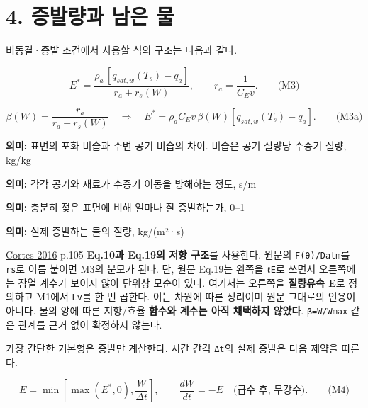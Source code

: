 \documentclass[11pt,a4paper]{article}
\begin{document}
\section{4. 증발량과 남은 물}

비동결·증발 조건에서 사용할 식의 구조는 다음과 같다.

\begin{equation*}
E^*=\frac{\rho_a\,[q_{sat,w}(T_s)-q_a]}{r_a+r_s(W)},\qquad
r_a=\frac{1}{C_Ev}.\qquad\text{(M3)}
\end{equation*}

\begin{equation*}
\beta(W)=\frac{r_a}{r_a+r_s(W)}\quad\Longrightarrow\quad
E^*=\rho_a C_Ev\,\beta(W)[q_{sat,w}(T_s)-q_a].\qquad\text{(M3a)}
\end{equation*}

\begin{description}[leftmargin=0pt,style=nextline]
\item[\texttt{qsat,w(Ts)−qa}] \textbf{의미:} 표면의 포화 비습과 주변 공기 비습의 차이. 비습은 공기 질량당 수증기 질량, kg/kg
\item[\texttt{ra}, \texttt{rs}] \textbf{의미:} 각각 공기와 재료가 수증기 이동을 방해하는 정도, s/m
\item[\texttt{β}] \textbf{의미:} 충분히 젖은 표면에 비해 얼마나 잘 증발하는가, 0–1
\item[\texttt{E}] \textbf{의미:} 실제 증발하는 물의 질량, kg/(m²·s)
\end{description}

\href{\detokenize{https://www.jstage.jst.go.jp/article/taiki/51/2/51_103/_pdf/-char/en}}{Cortes 2016} p.105 \textbf{Eq.10과 Eq.19의 저항 구조}를 사용한다. 원문의 \texttt{F(θ)/Datm}를 \texttt{rs}로 이름 붙이면 M3의 분모가 된다. 단, 원문 Eq.19는 왼쪽을 \texttt{ℓE}로 쓰면서 오른쪽에는 잠열 계수가 보이지 않아 단위상 모순이 있다. 여기서는 오른쪽을 \textbf{질량유속 E}로 정의하고 M1에서 \texttt{Lv}를 한 번 곱한다. 이는 차원에 따른 정리이며 원문 그대로의 인용이 아니다. 물의 양에 따른 저항/효율 \textbf{함수와 계수는 아직 채택하지 않았다}. \texttt{β=W/Wmax} 같은 관계를 근거 없이 확정하지 않는다.

가장 간단한 기본형은 증발만 계산한다. 시간 간격 \texttt{Δt}의 실제 증발은 다음 제약을 따른다.

\begin{equation*}
E=\min\!\left[\max(E^*,0),\frac{W}{\Delta t}\right],\qquad
\frac{dW}{dt}=-E\quad\text{(급수 후, 무강수)}.\qquad\text{(M4)}
\end{equation*}
\end{document}
